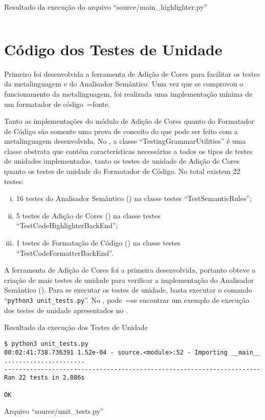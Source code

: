 \begin{code}
\caption{Resultado da execução do arquivo ``source/main\_highlighter.py''}
\label{MainHighlighterPyResult}
\inputminted{text}{aftertext/main_highlighter_output.txt}
\end{code}


\chapter[Testes de Unidade]{Código dos Testes de Unidade}

Primeiro foi desenvolvida a ferramenta de Adição de Cores para facilitar os testes da metalinguagem e
do Analisador Semântico.
Uma vez que se comprovou o funcionamento da metalinguagem,
foi realizada uma implementação mínima de um formatador de código~=fonte.

Tanto as implementações do módulo de Adição de Cores quanto do Formatador de Código são somente uma prova de conceito do que pode ser feito com a metalinguagem desenvolvida.
No ,
a classe ``TestingGrammarUtilities'' é uma classe abstrata \cite{understandingDataAbstraction} que contém características necessárias a todos os tipos de testes de unidades implementados,
tanto os testes de unidade de Adição de Cores quanto os testes de unidade do Formatador de Código.
No total existem 22 testes:
\begin{enumerate}[i)]
\item 16 testes do Analisador Semântico () na classe testes ``TestSemanticRules'';
\item 5 testes de Adição de Cores () na classe testes ``TestCodeHighlighterBackEnd'';
\item 1 testes de Formatação de Código () na classe testes ``TestCodeFormatterBackEnd''.
\end{enumerate}%

A ferramenta de Adição de Cores foi a primeira desenvolvida,
portanto obteve a criação de mais testes de unidade para verificar a implementação do Analisador Semântico ().
Para se executar os testes de unidade,
basta executar o comando ``\texttt{python3 unit_tests.py}''.
No ,
pode~=se encontrar um exemplo de execução dos testes de unidade apresentados no .
\begin{code}
\caption{Resultado da execução dos Testes de Unidade}
\label{unitTestsResults}
\begin{verbatim}
$ python3 unit_tests.py
00:02:41:738.736391 1.52e-04 - source.<module>:52 - Importing __main__
......................
----------------------------------------------------------------------
Ran 22 tests in 2.086s

OK
\end{verbatim}
\end{code}
\begin{code}
\caption{Arquivo ``source/unit\_tests.py''}
\label{unitTestsPy}
\inputminted[firstline=39,firstnumber=1]{python3}{../source/unit_tests.py}
\end{code}


